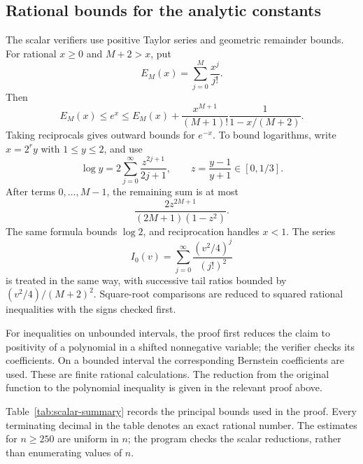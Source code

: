\subsection{Rational bounds for the analytic constants}

The scalar verifiers use positive Taylor series and geometric remainder
bounds. For rational $x\ge0$ and $M+2>x$, put
\[
 E_M(x)=\sum_{j=0}^{M}\frac{x^j}{j!}.
\]
Then
\[
 E_M(x)\le e^x\le E_M(x)+
 \frac{x^{M+1}}{(M+1)!}\frac1{1-x/(M+2)}.
\]
Taking reciprocals gives outward bounds for $e^{-x}$. To bound logarithms,
write $x=2^r y$ with $1\le y\le2$, and use
\[
 \log y=2\sum_{j=0}^{\infty}\frac{z^{2j+1}}{2j+1},
 \qquad z=\frac{y-1}{y+1}\in[0,1/3].
\]
After terms $0,\ldots,M-1$, the remaining sum is at most
\[
 \frac{2z^{2M+1}}{(2M+1)(1-z^2)}.
\]
The same formula bounds $\log2$, and reciprocation handles $x<1$.
The series
\[
 I_0(v)=\sum_{j=0}^{\infty}\frac{(v^2/4)^j}{(j!)^2}
\]
is treated in the same way, with successive tail ratios bounded by
$(v^2/4)/(M+2)^2$. Square-root comparisons are reduced to squared
rational inequalities with the signs checked first.

For inequalities on unbounded intervals, the proof first reduces the
claim to positivity of a polynomial in a shifted nonnegative variable;
the verifier checks its coefficients. On a bounded interval the
corresponding Bernstein coefficients are used. These are finite rational
calculations. The reduction from the original function to the polynomial
inequality is given in the relevant proof above.

Table~\ref{tab:scalar-summary} records the principal bounds used in the
proof. Every terminating decimal in the table denotes an exact rational
number. The estimates for $n\ge250$ are uniform in $n$; the program checks
the scalar reductions, rather than enumerating values of $n$.

